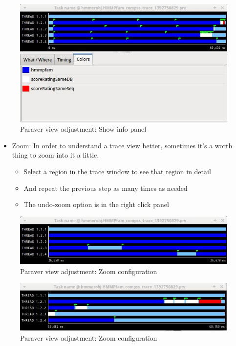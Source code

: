\begin{figure}[ht!]
  \centering
    \includegraphics[width=1.0\textwidth]{./Sections/4_Tools/Figures/5.jpeg}
    \caption{Paraver view adjustment: Show info panel}
\end{figure}

\begin{itemize}
 \item Zoom: In order to understand a trace view better, sometimes it’s a worth thing to zoom into it a little.
	\begin{itemize}
	    \item Select a region in the trace window to see that region in detail
	    \item And repeat the previous step as many times as needed
	    \item The undo-zoom option is in the right click panel
	\end{itemize}
\end{itemize}

\begin{figure}[ht!]
  \centering
    \includegraphics[width=1.0\textwidth]{./Sections/4_Tools/Figures/6.jpeg}
    \caption{Paraver view adjustment: Zoom configuration}
\end{figure}

\begin{figure}[ht!]
  \centering
    \includegraphics[width=1.0\textwidth]{./Sections/4_Tools/Figures/6_2.jpeg}
    \caption{Paraver view adjustment: Zoom configuration}
\end{figure}


